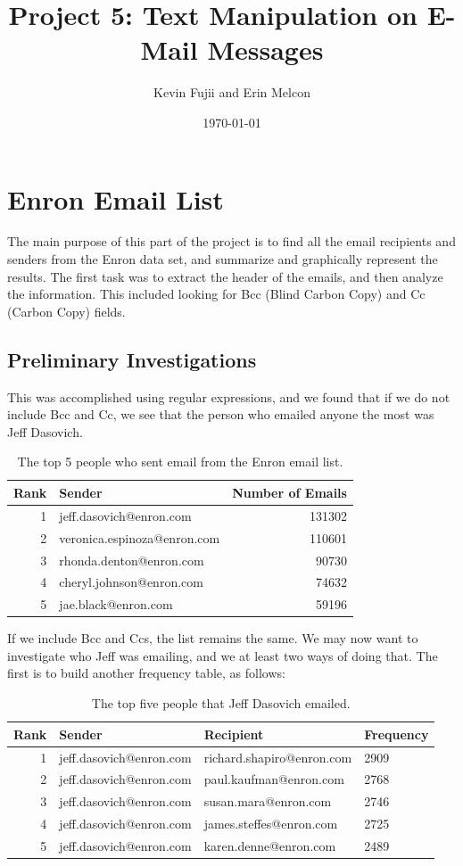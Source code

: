\documentclass[12pt, a4paper, oneside]{amsart}
\title{Project 5: Text Manipulation on E-Mail Messages}
\author{Kevin Fujii and Erin Melcon}
\date{\today}
\begin{document}
\section*{Enron Email List}
The main purpose of this part of the project is to find all the email recipients and senders from the Enron data set, and summarize and graphically represent the results.  The first task was to extract the header of the emails, and then analyze the information.  This included looking for Bcc (Blind Carbon Copy) and Cc (Carbon Copy) fields.
\subsection*{Preliminary Investigations}
This was accomplished using regular expressions, and we found that if we do not include Bcc and Cc, we see that the person who emailed anyone the most was Jeff Dasovich.
\begin{table}[h]
\begin{center}
\begin{tabular}{|r|l|r|}
  \hline
Rank & Sender & Number of Emails \\ 
  \hline
1 & jeff.dasovich@enron.com & 131302 \\ 
2 & veronica.espinoza@enron.com & 110601 \\ 
3 & rhonda.denton@enron.com & 90730 \\ 
4 & cheryl.johnson@enron.com & 74632 \\ 
5 & jae.black@enron.com & 59196 \\ 
 \hline
\end{tabular}
\caption{The top 5 people who sent email from the Enron email list.}
\label{table:allLibs}
\end{center}
\end{table}
If we include Bcc and Ccs, the list remains the same.  We may now want to investigate who Jeff was emailing, and we at least two ways of doing that. The first is to build another frequency table, as follows:
\begin{table}[h]
\begin{center}
\begin{tabular}{|r|l|l|l|}
  \hline
Rank & Sender & Recipient & Frequency \\ 
  \hline
 1 & jeff.dasovich@enron.com & richard.shapiro@enron.com & 2909 \\ 
  2 & jeff.dasovich@enron.com & paul.kaufman@enron.com & 2768 \\ 
  3 & jeff.dasovich@enron.com & susan.mara@enron.com & 2746 \\ 
  4 & jeff.dasovich@enron.com & james.steffes@enron.com & 2725 \\ 
  5 & jeff.dasovich@enron.com & karen.denne@enron.com & 2489 \\ 
   \hline
\end{tabular}
\caption{The top five people that Jeff Dasovich emailed.}
\label{table:allLibs}
\end{center}
\end{table}
\end{document}
